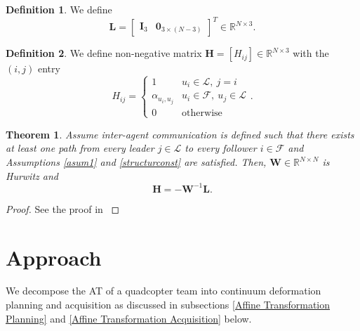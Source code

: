 \documentclass[journal]{IEEEtran}
\theoremstyle{definition}
\newtheorem{definition}{Definition}
\theoremstyle{plain}
\newtheorem{theorem}{Theorem}
\begin{document}
\begin{definition}
    We define 
    \begin{equation}
        \mathbf{L}=\begin{bmatrix}
            \mathbf{I}_3&\mathbf{0}_{3\times (N-3)}
        \end{bmatrix}^T\in \mathbb{R}^{N\times 3}.
    \end{equation}
\end{definition}
\begin{definition}
    We define non-negative matrix $\mathbf{H}=\left[H_{ij}\right]\in \mathbb{R}^{N\times 3}$ with the $(i,j)$ entry
    \begin{equation}
        H_{ij}=\begin{cases}
            1&u_i\in \mathcal{L},~j=i\\
            \alpha_{u_i,u_j}&u_i\in\mathcal{F},~u_j\in \mathcal{L}\\
            0&\mathrm{otherwise}
        \end{cases}
        .
    \end{equation}
\end{definition}
\begin{theorem}\label{thm2}
    Assume inter-agent communication is defined such that there exists at least one path from every leader $j\in \mathcal{L}$ to every follower $i\in \mathcal{F}$ and Assumptions \ref{asum1} and \ref{structurconst} are satisfied.
    Then, $\mathbf{W}\in \mathbb{R}^{N\times N}$ is Hurwitz and 
    \begin{equation}
        \mathbf{H}=-\mathbf{W}^{-1}\mathbf{L}.
    \end{equation}
\end{theorem}
\begin{proof}
    See the proof in \cite{rastgoftar2022integration, rastgoftar2021safe, rastgoftar2021scalable}
\end{proof}



\section{Approach}\label{Approach}
We decompose the AT of a quadcopter team into continuum deformation planning and acquisition as discussed in subsections \ref{Affine Transformation Planning} and \ref{Affine Transformation Acquisition} below. 
\end{document}
